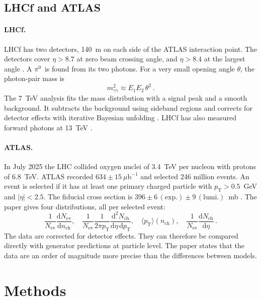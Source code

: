 \documentclass[11pt,a4paper]{article}
\newcommand{\pizero}{\ensuremath{\pi^{0}}}
\newcommand{\pT}{\ensuremath{p_{\mathrm{T}}}}
\newcommand{\nch}{\ensuremath{n_{\mathrm{ch}}}}
\newcommand{\dd}{\mathrm{d}}
\begin{document}
\subsection{LHCf and ATLAS}
\paragraph{LHCf.}
LHCf has two detectors, 140~m on each side of the ATLAS interaction point.
The detectors cover $\eta>8.7$ at zero beam crossing angle, and $\eta>8.4$ at the largest angle \cite{LHCf:2012pi0}.
A \pizero\ is found from its two photons.
For a very small opening angle $\theta$, the photon-pair mass is
\begin{equation}
  m_{\gamma\gamma}^{2}\approx E_{1}E_{2}\,\theta^{2}\,.
  \label{eq:mgg}
\end{equation}
The 7~TeV analysis fits the mass distribution with a signal peak and a smooth background.
It subtracts the background using sideband regions and corrects for detector effects with iterative Bayesian unfolding \cite{LHCf:2012pi0}.
LHCf has also measured forward photons at 13~TeV \cite{LHCf:2018photon}.

\paragraph{ATLAS.}
In July 2025 the LHC collided oxygen nuclei of 3.4~TeV per nucleon with protons of 6.8~TeV.
ATLAS recorded $634\pm15~\mu\mathrm{b}^{-1}$ and selected 246 million events.
An event is selected if it has at least one primary charged particle with $\pT>0.5$~GeV and $|\eta|<2.5$.
The fiducial cross section is $396\pm6\,(\mathrm{exp.})\pm9\,(\mathrm{lumi.})$~mb \cite{ATLAS:2026po}.
The paper gives four distributions, all per selected event:
\begin{equation}
  \frac{1}{N_{\mathrm{ev}}}\frac{\dd N_{\mathrm{ev}}}{\dd\nch},\quad
  \frac{1}{N_{\mathrm{ev}}}\frac{1}{2\pi\pT}\frac{\dd^{2}N_{\mathrm{ch}}}{\dd\eta\,\dd\pT},\quad
  \langle\pT\rangle(\nch),\quad
  \frac{1}{N_{\mathrm{ev}}}\frac{\dd N_{\mathrm{ch}}}{\dd\eta}\,.
  \label{eq:atlasobs}
\end{equation}
The data are corrected for detector effects.
They can therefore be compared directly with generator predictions at particle level.
The paper states that the data are an order of magnitude more precise than the differences between models.

\section{Methods}
\end{document}
